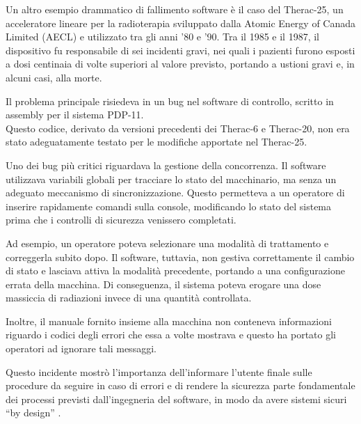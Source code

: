Un altro esempio drammatico di fallimento software è il caso del Therac-25, un acceleratore lineare per la radioterapia sviluppato dalla Atomic Energy of Canada Limited (AECL) e utilizzato tra gli anni '80 e '90. Tra il 1985 e il 1987, il dispositivo fu responsabile di sei incidenti gravi, nei quali i pazienti furono esposti a dosi centinaia di volte superiori al valore previsto, portando a ustioni gravi e, in alcuni casi, alla morte.

Il problema principale risiedeva in un bug nel software di controllo, scritto in assembly per il sistema PDP-11. \\Questo codice, derivato da versioni precedenti dei Therac-6 e Therac-20, non era stato adeguatamente testato per le modifiche apportate nel Therac-25.

Uno dei bug più critici riguardava la gestione della concorrenza. Il software utilizzava variabili globali per tracciare lo stato del macchinario, ma senza un adeguato meccanismo di sincronizzazione. Questo permetteva a un operatore di inserire rapidamente comandi sulla console, modificando lo stato del sistema prima che i controlli di sicurezza venissero completati.

Ad esempio, un operatore poteva selezionare una modalità di trattamento e correggerla subito dopo. Il software, tuttavia, non gestiva correttamente il cambio di stato e lasciava attiva la modalità precedente, portando a una configurazione errata della macchina. Di conseguenza, il sistema poteva erogare una dose massiccia di radiazioni invece di una quantità controllata.

Inoltre, il manuale fornito insieme alla macchina non conteneva informazioni riguardo i codici degli errori che essa a volte mostrava e questo ha portato gli operatori ad ignorare tali messaggi.

Questo incidente mostrò l'importanza dell'informare l'utente finale sulle procedure da seguire in caso di errori e di rendere la sicurezza parte fondamentale dei processi previsti dall'ingegneria del software, in modo da avere sistemi sicuri ``by design'' \cite{Leveson1993}.
